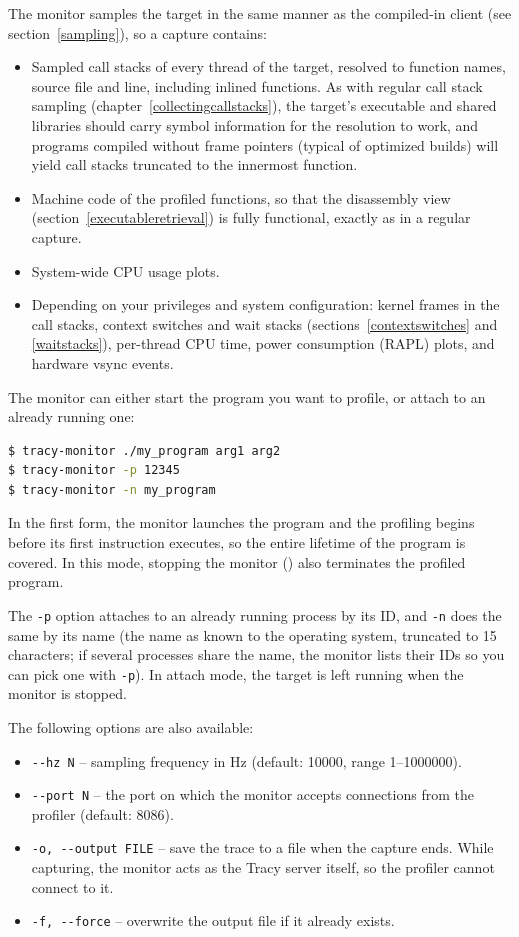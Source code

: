 \documentclass[hidelinks,titlepage,a4paper,twoside]{article}
\begin{document}
The monitor samples the target in the same manner as the compiled-in client (see section~\ref{sampling}), so a capture contains:

\begin{itemize}
\item Sampled call stacks of every thread of the target, resolved to function names, source file and line, including inlined functions. As with regular call stack sampling (chapter~\ref{collectingcallstacks}), the target's executable and shared libraries should carry symbol information for the resolution to work, and programs compiled without frame pointers (typical of optimized builds) will yield call stacks truncated to the innermost function.
\item Machine code of the profiled functions, so that the disassembly view (section~\ref{executableretrieval}) is fully functional, exactly as in a regular capture.
\item System-wide CPU usage plots.
\item Depending on your privileges and system configuration: kernel frames in the call stacks, context switches and wait stacks (sections~\ref{contextswitches} and \ref{waitstacks}), per-thread CPU time, power consumption (RAPL) plots, and hardware vsync events.
\end{itemize}

The monitor can either start the program you want to profile, or attach to an already running one:

\begin{lstlisting}[language=sh]
$ tracy-monitor ./my_program arg1 arg2
$ tracy-monitor -p 12345
$ tracy-monitor -n my_program
\end{lstlisting}

In the first form, the monitor launches the program and the profiling begins before its first instruction executes, so the entire lifetime of the program is covered. In this mode, stopping the monitor () also terminates the profiled program.

The \texttt{-p} option attaches to an already running process by its ID, and \texttt{-n} does the same by its name (the name as known to the operating system, truncated to 15 characters; if several processes share the name, the monitor lists their IDs so you can pick one with \texttt{-p}). In attach mode, the target is left running when the monitor is stopped.

The following options are also available:

\begin{itemize}
\item \texttt{-{}-hz N} -- sampling frequency in Hz (default: 10000, range 1--1000000).
\item \texttt{-{}-port N} -- the port on which the monitor accepts connections from the profiler (default: 8086).
\item \texttt{-o, -{}-output FILE} -- save the trace to a file when the capture ends. While capturing, the monitor acts as the Tracy server itself, so the profiler cannot connect to it.
\item \texttt{-f, -{}-force} -- overwrite the output file if it already exists.
\end{itemize}
\end{document}
